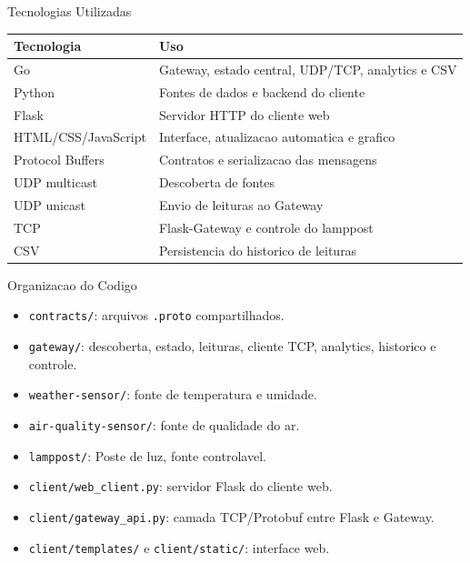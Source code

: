 \documentclass[aspectratio=169]{beamer}
\begin{document}
\begin{frame}{Tecnologias Utilizadas}
  \begin{table}
    \centering
    \begin{tabular}{ll}
      \toprule
      Tecnologia & Uso \\
      \midrule
      Go & Gateway, estado central, UDP/TCP, analytics e CSV \\
      Python & Fontes de dados e backend do cliente \\
      Flask & Servidor HTTP do cliente web \\
      HTML/CSS/JavaScript & Interface, atualizacao automatica e grafico \\
      Protocol Buffers & Contratos e serializacao das mensagens \\
      UDP multicast & Descoberta de fontes \\
      UDP unicast & Envio de leituras ao Gateway \\
      TCP & Flask-Gateway e controle do lamppost \\
      CSV & Persistencia do historico de leituras \\
      \bottomrule
    \end{tabular}
  \end{table}
\end{frame}

\begin{frame}{Organizacao do Codigo}
  \begin{itemize}
    \item \texttt{contracts/}: arquivos \texttt{.proto} compartilhados.
    \item \texttt{gateway/}: descoberta, estado, leituras, cliente TCP, analytics, historico e controle.
    \item \texttt{weather-sensor/}: fonte de temperatura e umidade.
    \item \texttt{air-quality-sensor/}: fonte de qualidade do ar.
    \item \texttt{lamppost/}: Poste de luz, fonte controlavel.
    \item \texttt{client/web\_client.py}: servidor Flask do cliente web.
    \item \texttt{client/gateway\_api.py}: camada TCP/Protobuf entre Flask e Gateway.
    \item \texttt{client/templates/} e \texttt{client/static/}: interface web.
  \end{itemize}
\end{frame}
\end{document}
